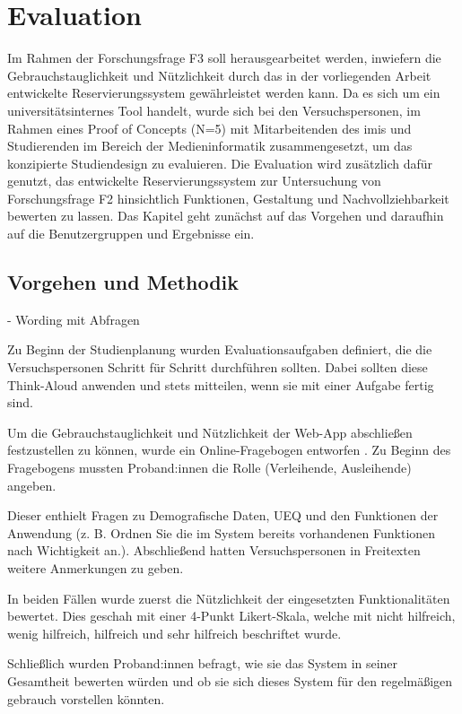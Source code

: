 
\chapter{Evaluation}
\label{chapter-evaluation}
Im Rahmen der Forschungsfrage F3 soll herausgearbeitet werden, inwiefern die Gebrauchstauglichkeit
und Nützlichkeit durch das in der vorliegenden Arbeit entwickelte Reservierungssystem gewährleistet
werden kann. Da es sich um ein universitätsinternes Tool handelt, wurde sich
bei den Versuchspersonen, im Rahmen eines Proof of Concepts (N=5) mit Mitarbeitenden des \ac{imis}
und Studierenden im Bereich der Medieninformatik zusammengesetzt, um das konzipierte Studiendesign
zu evaluieren. Die Evaluation wird zusätzlich dafür genutzt, das entwickelte Reservierungssystem zur
Untersuchung von Forschungsfrage F2 hinsichtlich Funktionen, Gestaltung und Nachvollziehbarkeit
bewerten zu lassen. Das Kapitel geht zunächst auf das Vorgehen und daraufhin auf die Benutzergruppen
und Ergebnisse ein.


\section{Vorgehen und Methodik}
- Wording mit Abfragen


Zu Beginn der Studienplanung wurden Evaluationsaufgaben definiert, die die Versuchspersonen Schritt
für Schritt durchführen sollten. Dabei sollten diese Think-Aloud anwenden und stets mitteilen, wenn sie
mit einer Aufgabe fertig sind.

Um die Gebrauchstauglichkeit und Nützlichkeit der Web-App abschließen festzustellen zu können, wurde ein
Online-Fragebogen entworfen . Zu Beginn des Fragebogens mussten Proband:innen die Rolle
(Verleihende, Ausleihende) angeben. 

Dieser enthielt Fragen zu Demografische Daten, UEQ und
den Funktionen der Anwendung (z. B. Ordnen Sie die im System bereits vorhandenen Funktionen nach
Wichtigkeit an.). Abschließend hatten Versuchspersonen in Freitexten weitere Anmerkungen zu geben.

In beiden Fällen wurde zuerst die Nützlichkeit der eingesetzten Funktionalitäten bewertet. Dies geschah mit einer
4-Punkt Likert-Skala, welche mit nicht hilfreich, wenig hilfreich, hilfreich und sehr hilfreich beschriftet
wurde. 

Schließlich wurden Proband:innen befragt, wie sie das System in seiner Gesamtheit bewerten würden
und ob sie sich dieses System für den regelmäßigen gebrauch vorstellen könnten.




